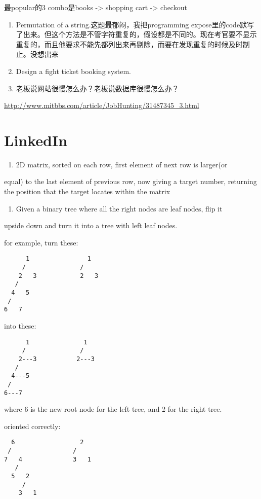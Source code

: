 \documentclass[12pt]{book}
\begin{document}
最popular的3 combo是books -> shopping cart -> checkout

\begin{enumerate}
\item Permutation of a string.这题最郁闷，我把programming expose里的code默写了出来。但这个方法是不管字符重复的，假设都是不同的。现在考官要不显示重复的，而且他要求不能先都列出来再剔除，而要在发现重复的时候及时制止。没想出来

\item Design a fight ticket booking system.

\item 老板说网站很慢怎么办？老板说数据库很慢怎么办？
\end{enumerate}

\url{http://www.mitbbs.com/article/JobHunting/31487345_3.html}

\chapter{LinkedIn}
\label{sec-17}
\begin{enumerate}
\item 2D matrix, sorted on each row, first element of next row is larger(or
\end{enumerate}
equal) to the last element of previous row, now giving a target number, 
returning the position that the target locates within the matrix

\begin{enumerate}
\item Given a binary tree where all the right nodes are leaf nodes, flip it
\end{enumerate}
upside down and turn it into a tree with left leaf nodes.

for example, turn these:
\lstset{language=java,label= ,caption= ,numbers=none}
\begin{lstlisting}
      1                1
     /               / 
    2   3            2   3
   / 
  4   5
 / 
6   7
\end{lstlisting}

into these:
\lstset{language=java,label= ,caption= ,numbers=none}
\begin{lstlisting}
      1               1
     /               /
    2---3           2---3
   /
  4---5
 /
6---7
\end{lstlisting}

where 6 is the new root node for the left tree, and 2 for the right tree.

oriented correctly:
\lstset{language=java,label= ,caption= ,numbers=none}
\begin{lstlisting}
  6                  2
 /                 / 
7   4              3   1
   / 
  5   2
     / 
    3   1
\end{lstlisting}
\end{document}
